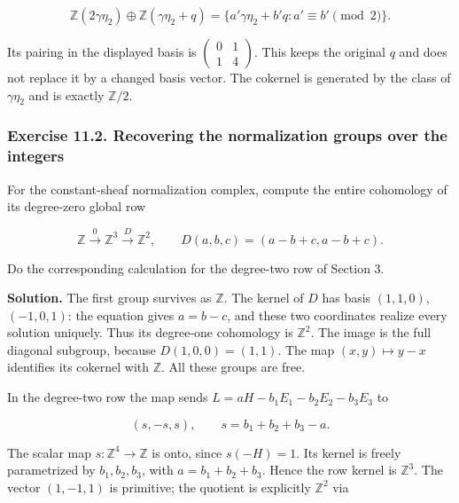 \begin{equation}
\mathbb Z(2\gamma\eta_2)\oplus
\mathbb Z(\gamma\eta_2+q)
=\{a'\gamma\eta_2+b'q:a'\equiv b'\pmod2\}.
\label{courseIII:integral-homology-and-sphere-recognition:eq:11.3}
\end{equation}

Its pairing in the displayed basis is \(\begin{pmatrix}0&1\\1&4\end{pmatrix}\). This keeps the original \(q\) and does not replace it by a changed basis vector. The cokernel is generated by the class of \(\gamma\eta_2\) and is exactly \(\mathbb Z/2\).

\subsubsection{Exercise 11.2. Recovering the normalization groups over the integers}
\label{courseIII:integral-homology-and-sphere-recognition:exercise-11.2}

For the constant-sheaf normalization complex, compute the entire cohomology of its degree-zero global row

\begin{equation}
\mathbb Z\xrightarrow{0}\mathbb Z^3
\xrightarrow{D}\mathbb Z^2,\qquad
D(a,b,c)=(a-b+c,a-b+c).
\label{courseIII:integral-homology-and-sphere-recognition:eq:11.4}
\end{equation}

Do the corresponding calculation for the degree-two row of Section 3.

\textbf{Solution.} The first group survives as \(\mathbb Z\). The kernel of \(D\) has basis \((1,1,0)\), \((-1,0,1)\): the equation gives \(a=b-c\), and these two coordinates realize every solution uniquely. Thus its degree-one cohomology is \(\mathbb Z^2\). The image is the full diagonal subgroup, because \(D(1,0,0)=(1,1)\). The map \((x,y)\mapsto y-x\) identifies its cokernel with \(\mathbb Z\). All these groups are free.

In the degree-two row the map sends
\(L=aH-b_1E_1-b_2E_2-b_3E_3\) to

\begin{equation}
(s,-s,s),\qquad s=b_1+b_2+b_3-a.
\label{courseIII:integral-homology-and-sphere-recognition:eq:11.5}
\end{equation}

The scalar map \(s:\mathbb Z^4\to\mathbb Z\) is onto, since \(s(-H)=1\). Its kernel is freely parametrized by \(b_1,b_2,b_3\), with \(a=b_1+b_2+b_3\). Hence the row kernel is \(\mathbb Z^3\). The vector \((1,-1,1)\) is primitive; the quotient is explicitly \(\mathbb Z^2\) via

